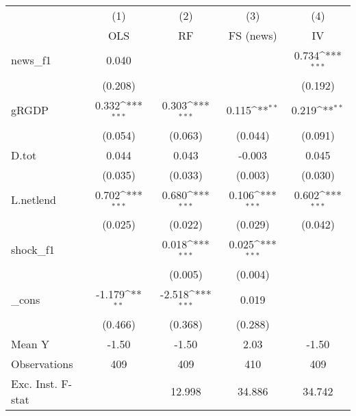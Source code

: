 {
\def\sym#1{\ifmmode^{#1}\else\(^{#1}\)\fi}
\begin{tabular}{l*{4}{c}}
\toprule
            &\multicolumn{1}{c}{(1)}&\multicolumn{1}{c}{(2)}&\multicolumn{1}{c}{(3)}&\multicolumn{1}{c}{(4)}\\
            &\multicolumn{1}{c}{OLS}&\multicolumn{1}{c}{RF}&\multicolumn{1}{c}{FS (news)}&\multicolumn{1}{c}{IV}\\
\midrule
news\_f1     &       0.040         &                     &                     &       0.734\sym{***}\\
            &     (0.208)         &                     &                     &     (0.192)         \\
\addlinespace
gRGDP       &       0.332\sym{***}&       0.303\sym{***}&       0.115\sym{**} &       0.219\sym{**} \\
            &     (0.054)         &     (0.063)         &     (0.044)         &     (0.091)         \\
\addlinespace
D.tot       &       0.044         &       0.043         &      -0.003         &       0.045         \\
            &     (0.035)         &     (0.033)         &     (0.003)         &     (0.030)         \\
\addlinespace
L.netlend   &       0.702\sym{***}&       0.680\sym{***}&       0.106\sym{***}&       0.602\sym{***}\\
            &     (0.025)         &     (0.022)         &     (0.029)         &     (0.042)         \\
\addlinespace
shock\_f1    &                     &       0.018\sym{***}&       0.025\sym{***}&                     \\
            &                     &     (0.005)         &     (0.004)         &                     \\
\addlinespace
\_cons      &      -1.179\sym{**} &      -2.518\sym{***}&       0.019         &                     \\
            &     (0.466)         &     (0.368)         &     (0.288)         &                     \\
\midrule
Mean Y      &       -1.50         &       -1.50         &        2.03         &       -1.50         \\
Observations&         409         &         409         &         410         &         409         \\
Exc. Inst. F-stat&                     &      12.998         &      34.886         &      34.742         \\
\bottomrule
\end{tabular}
}
